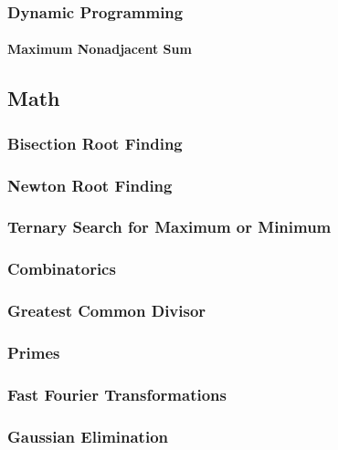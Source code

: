 \documentclass[8pt]{article}
\begin{document}
\subsubsection{Dynamic Programming}
\paragraph{Maximum Nonadjacent Sum}


\subsection{Math}
\subsubsection{Bisection Root Finding}

\subsubsection{Newton Root Finding}

\subsubsection{Ternary Search for Maximum or Minimum}

\subsubsection{Combinatorics}

\subsubsection{Greatest Common Divisor}

\subsubsection{Primes}

\subsubsection{Fast Fourier Transformations}

\subsubsection{Gaussian Elimination}

\end{document}
